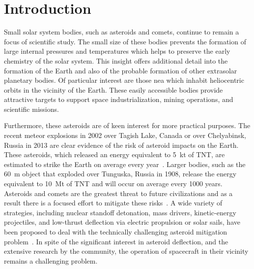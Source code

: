 
\chapter{Introduction}
Small solar system bodies, such as asteroids and comets, continue to remain a focus of scientific study.
The small size of these bodies prevents the formation of large internal pressures and temperatures which helps to preserve the early chemistry of the solar system.
This insight offers additional detail into the formation of the Earth and also of the probable formation of other extrasolar planetary bodies.
Of particular interest are those \gls{nea} which inhabit heliocentric orbits in the vicinity of the Earth. 
These easily accessible bodies provide attractive targets to support space industrialization, mining operations, and scientific missions.

Furthermore, these asteroids are of keen interest for more practical purposes.
The recent meteor explosions in 2002 over Tagish Lake, Canada or over Chelyabinsk, Russia in 2013 are clear evidence of the risk of asteroid impacts on the Earth.
These asteroids, which released an energy equivalent to \SI{5}{\kilo\tonne} of TNT, are estimated to strike the Earth on average every year~\cite{brown2002}.
Larger bodies, such as the \SI{60}{\meter} object that exploded over Tunguska, Russia in 1908, release the energy equivalent to \SI{10}{\mega\tonne} of TNT and will occur on average every \num{1000} years.
Asteroids and comets are the greatest threat to future civilizations and as a result there is a focused effort to mitigate these risks~\cite{wie2008}.
A wide variety of strategies, including nuclear standoff detonation, mass drivers, kinetic-energy projectiles, and low-thrust deflection via electric propulsion or solar sails, have been proposed to deal with the technically challenging asteroid mitigation problem~\cite{adams2004}.
In spite of the significant interest in asteroid deflection, and the extensive research by the community, the operation of spacecraft in their vicinity remains a challenging problem.

